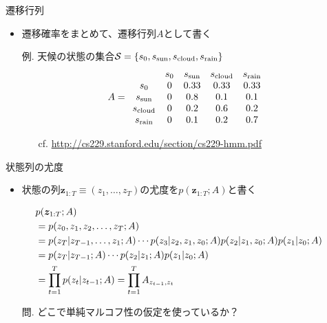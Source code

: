\documentclass[aspectratio=169,unicode,dvipdfmx,14pt]{beamer}
\begin{document}
\begin{frame}{遷移行列}
\begin{itemize}
\item 遷移確率をまとめて、遷移行列$A$として書く
\item[例.] 天候の状態の集合$\mathcal{S} = \{ s_0, s_{\mbox{\scriptsize sun}},
s_{\mbox{\scriptsize cloud}}, s_{\mbox{\scriptsize rain}} \}$
\begin{align}
A =
    \begin{array}{ccccc}
 & s_0 & s_{\mbox{\scriptsize sun}} & s_{\mbox{\scriptsize cloud}} & s_{\mbox{\scriptsize rain}} \\
s_0 & 0 & 0.33 & 0.33 & 0.33 \\
s_{\mbox{\scriptsize sun}} & 0 & 0.8 & 0.1 & 0.1 \\
s_{\mbox{\scriptsize cloud}} & 0 & 0.2 & 0.6 & 0.2 \\
s_{\mbox{\scriptsize rain}} & 0 & 0.1 & 0.2 & 0.7
    \end{array}
\end{align}
\vspace{-.1in}
\begin{itemize}
\item[cf.] \href{http://cs229.stanford.edu/section/cs229-hmm.pdf}{http://cs229.stanford.edu/section/cs229-hmm.pdf}
\end{itemize}
\end{itemize}
\end{frame}

\begin{frame}{状態列の尤度}
\begin{itemize}
\item 状態の列$\bm{z}_{1:T}\equiv(z_1,\ldots,z_T)$の尤度を$p(\bm{z}_{1:T};A)$と書く
\end{itemize}
\begin{align}
& p(\bm{z}_{1:T};A) 
\notag \\ & = p(z_0,z_1,z_2,\ldots,z_T;A)
\notag \\ 
& = p(z_T | z_{T-1},\ldots,z_1;A) \cdots 
p(z_3|z_2,z_1,z_0;A)p(z_2|z_1,z_0;A) p(z_1|z_0;A) \notag \\
& = p(z_T | z_{T-1};A) \cdots p(z_2|z_1;A) p(z_1|z_0;A) \notag \\
& = \prod_{t=1}^T p(z_t | z_{t-1};A) = \prod_{t=1}^T A_{z_{t-1}, z_t}
\label{eq:seq_LH}
\end{align}
\vspace{-.1in}
\begin{itemize}
\item[問.] どこで単純マルコフ性の仮定を使っているか？
\end{itemize}
\end{frame}
\end{document}
